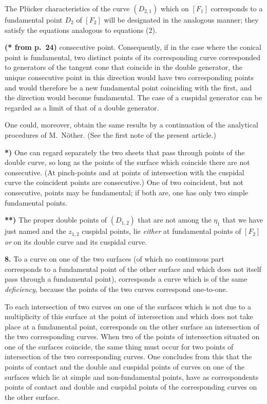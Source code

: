 \documentclass{article}
\begin{document}
The Plücker characteristics of the curve $(D_{2, 1})$ which on $[F_1]$ corresponds to a fundamental point $D_2$ of $[F_2]$ will be designated in the analogous manner; they satisfy the equations analogous to equations (2).

\textbf{(* from p.~24)} consecutive point. Consequently, if in the case where the conical point is fundamental, two distinct points of its corresponding curve corresponded to generators of the tangent cone that coincide in the double generator, the unique consecutive point in this direction would have two corresponding points and would therefore be a new fundamental point coinciding with the first, and the direction would become fundamental. The case of a cuspidal generator can be regarded as a limit of that of a double generator.

One could, moreover, obtain the same results by a continuation of the analytical procedures of M.~Nöther. (See the first note of the present article.)

\textbf{*)} One can regard separately the two sheets that pass through points of the double curve, so long as the points of the surface which coincide there are not consecutive. (At pinch-points and at points of intersection with the cuspidal curve the coincident points are consecutive.) One of two coincident, but not consecutive, points may be fundamental; if both are, one has only two simple fundamental points.

\textbf{**)} The proper double points of $(D_{1, 2})$ that are not among the $\eta_1$ that we have just named and the $z_{1, 2}$ cuspidal points, lie \emph{either} at fundamental points of $[F_2]$ \emph{or} on its double curve and its cuspidal curve.

\textbf{8.} To a curve on one of the two surfaces (of which no continuous part corresponds to a fundamental point of the other surface and which does not itself pass through a fundamental point), corresponds a curve which is of the same \emph{deficiency}, because the points of the two curves correspond one-to-one.

To each intersection of two curves on one of the surfaces which is not due to a multiplicity of this surface at the point of intersection and which does not take place at a fundamental point, corresponds on the other surface an intersection of the two corresponding curves. When two of the points of intersection situated on one of the surfaces coincide, the same thing must occur for two points of intersection of the two corresponding curves. One concludes from this that the points of contact and the double and cuspidal points of curves on one of the surfaces which lie at simple and non-fundamental points, have as correspondents points of contact and double and cuspidal points of the corresponding curves on the other surface.
\end{document}
